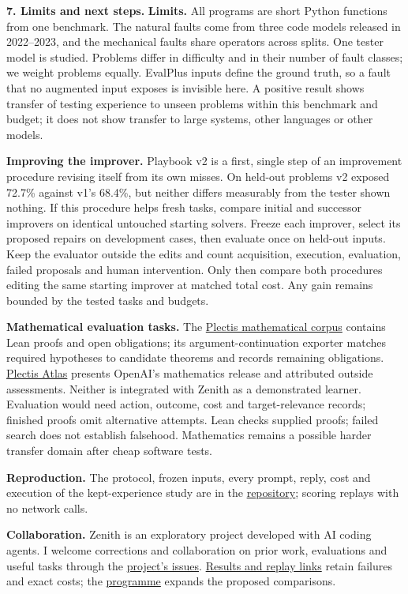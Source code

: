 \documentclass[11pt]{article}
\begin{document}
\hypertarget{research}{}
\textbf{7. Limits and next steps.}
\textbf{Limits.} All programs are short Python functions from one benchmark.
The natural faults come from three code models released in 2022--2023, and the
mechanical faults share operators across splits. One tester model is studied.
Problems differ in difficulty and in their number of fault classes; we weight
problems equally. EvalPlus inputs define the ground truth, so a fault that no
augmented input exposes is invisible here. A positive result shows transfer of
testing experience to unseen problems within this benchmark and budget; it does
not show transfer to large systems, other languages or other models.

\textbf{Improving the improver.} Playbook v2 is a first, single step of an
improvement procedure revising itself from its own misses. On held-out problems v2 exposed 72.7\% against v1's 68.4\%, but
neither differs measurably from the tester shown nothing.
If this procedure helps fresh tasks, compare initial and successor improvers
on identical untouched starting solvers. Freeze each improver, select its
proposed repairs on development cases, then evaluate once on held-out inputs. Keep the
evaluator outside the edits and count acquisition, execution, evaluation,
failed proposals and human intervention. Only then compare both procedures editing the same starting improver
at matched total cost. Any gain
remains bounded by the tested tasks and budgets.

\textbf{Mathematical evaluation tasks.}
The \href{https://github.com/wcook04/plectis-erdos}{Plectis mathematical corpus}
contains Lean proofs and open obligations; its argument-continuation exporter
matches required hypotheses to candidate theorems and records remaining obligations.
\href{https://github.com/wcook04/plectis-atlas}{Plectis Atlas} presents OpenAI's
mathematics release and attributed outside assessments. Neither is integrated
with Zenith as a demonstrated learner. Evaluation would need action, outcome,
cost and target-relevance records; finished proofs omit alternative attempts.
Lean checks supplied proofs; failed search does not establish falsehood.
Mathematics remains a possible harder transfer domain after cheap software tests.

\textbf{Reproduction.} The protocol, frozen inputs, every prompt, reply, cost and execution of the kept-experience study are in the
\href{https://github.com/wcook04/plectis-zenith}{repository}; scoring replays with
no network calls.

\textbf{Collaboration.}
Zenith is an exploratory project developed with AI coding agents. I welcome
corrections and collaboration on prior work, evaluations and useful tasks through the
\href{https://github.com/wcook04/plectis-zenith/issues}{project's issues}.
\href{https://github.com/wcook04/plectis-zenith/blob/main/docs/status.md}{Results and replay links}
retain failures and exact costs; the
\href{https://github.com/wcook04/plectis-zenith/blob/main/program.md}{programme}
expands the proposed comparisons.
\end{document}
